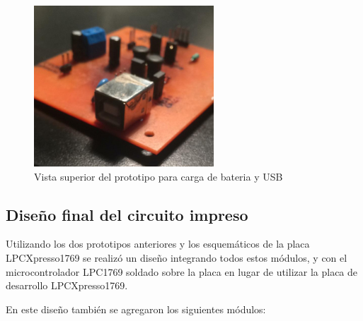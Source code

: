 \begin{figure}[!htbp]
	\centering	
	\includegraphics[width=0.6\textwidth]{./Figures/pcbBateriaSup.jpeg}			
	\caption{Vista superior del prototipo para carga de bateria y USB}
	\label{fig:pcbBateriaSup}
\end{figure}


\subsection{Diseño final del circuito impreso} \label{disFinal}

Utilizando los dos prototipos anteriores y los esquemáticos de la placa LPCXpresso1769 \citep{ea2011} se realizó un diseño integrando todos estos módulos, y con el microcontrolador LPC1769 soldado sobre la placa en lugar de utilizar la placa de desarrollo LPCXpresso1769. 

En este diseño también se agregaron los siguientes módulos:

